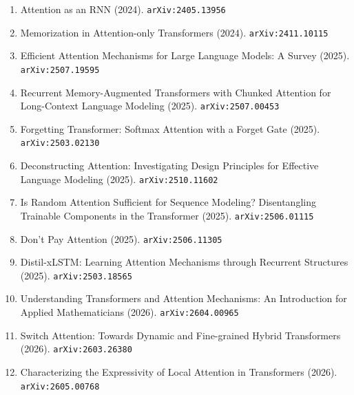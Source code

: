 \documentclass[11pt]{article}
\begin{document}
\begin{enumerate}
  \item Attention as an RNN (2024). \texttt{arXiv:2405.13956}
  \item Memorization in Attention-only Transformers (2024). \texttt{arXiv:2411.10115}
  \item Efficient Attention Mechanisms for Large Language Models: A Survey (2025). \texttt{arXiv:2507.19595}
  \item Recurrent Memory-Augmented Transformers with Chunked Attention for Long-Context Language Modeling (2025). \texttt{arXiv:2507.00453}
  \item Forgetting Transformer: Softmax Attention with a Forget Gate (2025). \texttt{arXiv:2503.02130}
  \item Deconstructing Attention: Investigating Design Principles for Effective Language Modeling (2025). \texttt{arXiv:2510.11602}
  \item Is Random Attention Sufficient for Sequence Modeling? Disentangling Trainable Components in the Transformer (2025). \texttt{arXiv:2506.01115}
  \item Don't Pay Attention (2025). \texttt{arXiv:2506.11305}
  \item Distil-xLSTM: Learning Attention Mechanisms through Recurrent Structures (2025). \texttt{arXiv:2503.18565}
  \item Understanding Transformers and Attention Mechanisms: An Introduction for Applied Mathematicians (2026). \texttt{arXiv:2604.00965}
  \item Switch Attention: Towards Dynamic and Fine-grained Hybrid Transformers (2026). \texttt{arXiv:2603.26380}
  \item Characterizing the Expressivity of Local Attention in Transformers (2026). \texttt{arXiv:2605.00768}
\end{enumerate}
\end{document}
